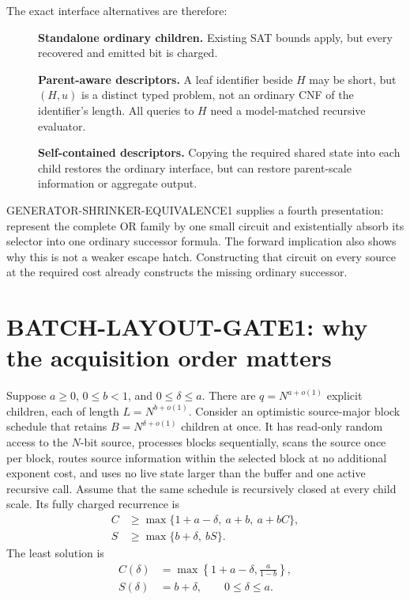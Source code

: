 \documentclass[11pt]{article}
\begin{document}
The exact interface alternatives are therefore:
\begin{description}
\item[] \textbf{Standalone ordinary children.}
Existing SAT bounds apply, but every recovered and emitted bit is charged.

\item[] \textbf{Parent-aware descriptors.}
A leaf identifier beside $H$ may be short, but $(H,u)$ is a distinct typed
problem, not an ordinary CNF of the identifier's length.  All queries to $H$
need a model-matched recursive evaluator.

\item[] \textbf{Self-contained descriptors.}
Copying the required shared state into each child restores the ordinary
interface, but can restore parent-scale information or aggregate output.
\end{description}

GENERATOR-SHRINKER-EQUIVALENCE1 supplies a fourth presentation: represent the
complete OR family by one small circuit and existentially absorb its selector
into one ordinary successor formula.  The forward implication also shows why
this is not a weaker escape hatch.  Constructing that circuit on every source
at the required cost already constructs the missing ordinary successor.

\section{BATCH-LAYOUT-GATE1: why the acquisition order matters}
\label{sec:layout}

Suppose $a\ge0$, $0\le b<1$, and $0\le\delta\le a$.  There are
$q=N^{a+o(1)}$ explicit children, each of length $L=N^{b+o(1)}$.  Consider an
optimistic source-major block schedule that retains
$B=N^{\delta+o(1)}$ children at once.  It has read-only random access to the
$N$-bit source, processes blocks sequentially, scans the source once per
block, routes source information within the selected block at no additional
exponent cost, and uses no live state larger than the buffer and one active
recursive call.  Assume that the same schedule is recursively closed at every
child scale.  Its fully charged recurrence is
\begin{align}
 C&\ge\max\{1+a-\delta,\ a+b,\ a+bC\},\nonumber\\
 S&\ge\max\{b+\delta,\ bS\}.\nonumber
\end{align}
The least solution is
\begin{align}
 C(\delta)&=\max\left\{1+a-\delta,\frac{a}{1-b}\right\},
 \label{eq:layout-time}\\
 S(\delta)&=b+\delta,
 \qquad 0\le\delta\le a.
 \label{eq:layout-space}
\end{align}
\end{document}
